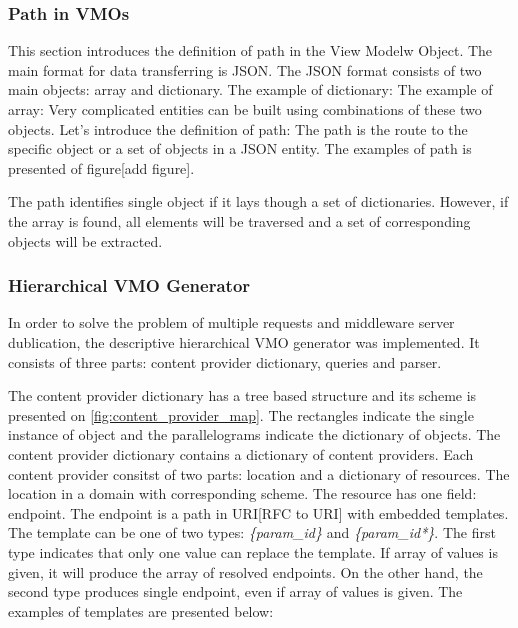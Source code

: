 

\subsubsection{Path in VMOs}

This section introduces the definition of path in the View Modelw Object. The main format for data transferring is JSON. The JSON format consists of two main objects: array and dictionary. The example of dictionary: 
The example of array: 
Very complicated entities can be built using combinations of these two objects. Let's introduce the definition of path: The path is the route to the specific object or a set of objects in a JSON entity. 
The examples of path is presented of figure[add figure]. 

The path identifies single object if it lays though a set of dictionaries. However, if the array is found, all elements will be traversed and a set of corresponding objects will be extracted. 

\subsubsection{Hierarchical VMO Generator}

In order to solve the problem of multiple requests and middleware server dublication, the descriptive hierarchical VMO generator was implemented. It consists of three parts: content provider dictionary, queries and parser. 

The content provider dictionary has a tree based structure and its scheme is presented on \ref{fig:content_provider_map}. The rectangles indicate the single instance of object and the parallelograms indicate the dictionary of objects. The content provider dictionary contains a dictionary of content providers. Each content provider consitst of two parts: location and a dictionary of resources. The location in a domain with corresponding scheme. The resource has one field: endpoint. The endpoint is a path in URI[RFC to URI] with embedded templates. The template can be one of two types: \textit{\{param\_id\}} and \textit{\{param\_id*\}}. The first type indicates that only one value can replace the template. If array of values is given, it will produce the array of resolved endpoints. On the other hand, the second type produces single endpoint, even if array of values is given. The examples of templates are presented below: 

